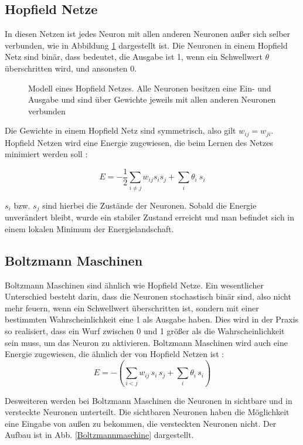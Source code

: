 \documentclass[12pt]{article}
\begin{document}
	
	\subsection{Hopfield Netze}	
	In diesen Netzen ist jedes Neuron mit allen anderen Neuronen außer sich selber verbunden, wie in Abbildung \ref{HopfieldNetz} dargestellt ist.  Die Neuronen in einem Hopfield Netz sind binär, dass bedeutet, die Ausgabe ist 1, wenn ein Schwellwert $\theta$ überschritten wird, und ansonsten 0.
	\begin{figure}[H]
	\center
	
	\caption{Modell eines Hopfield Netzes. Alle Neuronen besitzen eine Ein- und Ausgabe und sind über Gewichte jeweils mit allen anderen Neuronen verbunden}
	\label{HopfieldNetz}
	\end{figure}
Die Gewichte in einem Hopfield Netz sind symmetrisch, also gilt $w_{ij} = w_{ji}$. Hopfield Netzen wird eine Energie zugewiesen, die beim Lernen des Netzes minimiert werden soll \cite{Hopfield}:

\begin{equation}
E = -\frac{1}{2}\sum_{i\neq j}{w_{ij}{s_i}{s_j}}+\sum_i{\theta_i\ s_i}
\end{equation}

$s_i$ bzw. $s_j$ sind hierbei die Zustände der Neuronen. Sobald die Energie unverändert bleibt, wurde ein stabiler Zustand erreicht und man befindet sich in einem lokalen Minimum der Energielandschaft.

\subsection{Boltzmann Maschinen}	
Boltzmann Maschinen sind ähnlich wie Hopfield Netze. Ein wesentlicher Unterschied besteht darin, dass die Neuronen stochastisch binär sind, also nicht mehr feuern, wenn ein Schwellwert überschritten ist, sondern mit einer bestimmten Wahrscheinlichkeit eine 1 als Ausgabe haben. Dies wird in der Praxis so realisiert, dass ein Wurf zwischen 0 und 1 größer als die Wahrscheinlichkeit sein muss, um das Neuron zu aktivieren. Boltzmann Maschinen wird auch eine Energie zugewiesen, die ähnlich der von Hopfield Netzen ist \cite{BM}:
\begin{equation}
E = -\left(\sum_{i<j} w_{ij} \, s_i \, s_j + \sum_i \theta_i \, s_i \right)
\end{equation}

Desweiteren werden bei Boltzmann Maschinen die Neuronen in sichtbare und in versteckte Neuronen unterteilt. Die sichtbaren Neuronen haben die Möglichkeit eine Eingabe von außen zu bekommen, die versteckten Neuronen nicht. Der Aufbau ist in Abb. \ref{Boltzmannmaschine} dargestellt.
\end{document}
